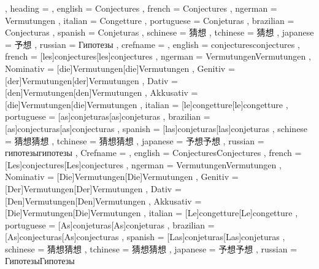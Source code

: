   {
    , heading =   {
                    , english     = Conjectures
                    , french      = Conjectures
                    , ngerman     = Vermutungen
                    , italian     = Congetture
                    , portuguese  = Conjeturas
                    , brazilian   = Conjecturas
                    , spanish     = Conjeturas
                    , schinese    = 猜想
                    , tchinese    = 猜想
                    , japanese    = 予想
                    , russian     = Гипотезы
                  }
    , crefname =  {
                    , english     = {conjectures}{conjectures}
                    , french      = [les]{conjectures}[les]{conjectures}
                    , ngerman     = { {Vermutungen}{Vermutungen}
                                      , Nominativ = [die]{Vermutungen}[die]{Vermutungen}
                                      , Genitiv   = [der]{Vermutungen}[der]{Vermutungen}
                                      , Dativ     = [den]{Vermutungen}[den]{Vermutungen}
                                      , Akkusativ = [die]{Vermutungen}[die]{Vermutungen}
                                    }
                    , italian     = [le]{congetture}[le]{congetture}
                    , portuguese  = [as]{conjeturas}[as]{conjeturas}
                    , brazilian   = [as]{conjecturas}[as]{conjecturas}
                    , spanish     = [las]{conjeturas}[las]{conjeturas}
                    , schinese    = {猜想}{猜想}
                    , tchinese    = {猜想}{猜想}
                    , japanese    = {予想}{予想}
                    , russian     = {гипотезы}{гипотезы}
                  }
    , Crefname =  {
                    , english     = {Conjectures}{Conjectures}
                    , french      = [Les]{conjectures}[Les]{conjectures}
                    , ngerman     = { {Vermutungen}{Vermutungen}
                                      , Nominativ = [Die]{Vermutungen}[Die]{Vermutungen}
                                      , Genitiv   = [Der]{Vermutungen}[Der]{Vermutungen}
                                      , Dativ     = [Den]{Vermutungen}[Den]{Vermutungen}
                                      , Akkusativ = [Die]{Vermutungen}[Die]{Vermutungen}
                                    }
                    , italian     = [Le]{congetture}[Le]{congetture}
                    , portuguese  = [As]{conjeturas}[As]{conjeturas}
                    , brazilian   = [As]{conjecturas}[As]{conjecturas}
                    , spanish     = [Las]{conjeturas}[Las]{conjeturas}
                    , schinese    = {猜想}{猜想}
                    , tchinese    = {猜想}{猜想}
                    , japanese    = {予想}{予想}
                    , russian     = {Гипотезы}{Гипотезы}
                  }
  }

